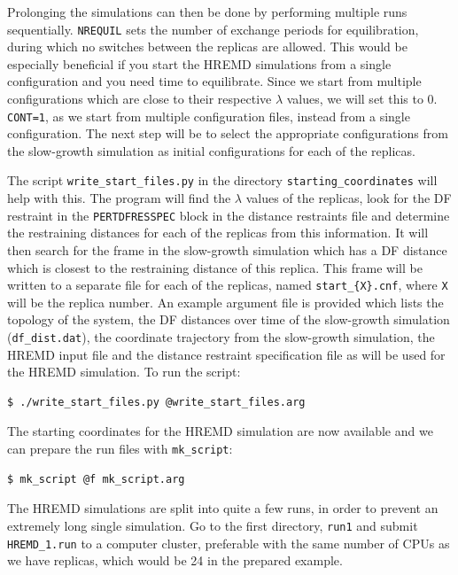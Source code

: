 Prolonging the simulations can then be done by performing multiple runs sequentially. 
\texttt{NREQUIL} sets the number of exchange periods for equilibration, during which no switches between the replicas are allowed. 
This would be especially beneficial if you start the HREMD simulations from a single configuration and you need time to equilibrate. 
Since we start from multiple configurations which are close to their respective $\lambda$ values, we will set this to 0. 
\texttt{CONT=1}, as we start from multiple configuration files, instead from a single configuration.
The next step will be to select the appropriate configurations from the slow-growth simulation as initial configurations for each of the replicas.

The script \texttt{write\_start\_files.py} in the directory \texttt{starting\_coordinates} will help with this. 
The program will find the $\lambda$ values of the replicas, look for the DF restraint in the \texttt{PERTDFRESSPEC} block in the distance restraints file and determine the restraining distances for each of the replicas from this information.
It will then search for the frame in the slow-growth simulation which has a DF distance which is closest to the restraining distance of this replica.
This frame will be written to a separate file for each of the replicas, named \texttt{start\_\{X\}.cnf}, where \texttt{X} will be the replica number. 
An example argument file is provided which lists the topology of the system, the DF distances over time of the slow-growth simulation (\texttt{df\_dist.dat}), the coordinate trajectory from the slow-growth simulation, the HREMD input file and the distance restraint specification file as will be used for the HREMD simulation. To run the script:
\begin{lstlisting}
$ ./write_start_files.py @write_start_files.arg 
\end{lstlisting}
The starting coordinates for the HREMD simulation are now available and we can prepare the run files with \texttt{mk\_script}:
\begin{lstlisting}
$ mk_script @f mk_script.arg
\end{lstlisting}
The HREMD simulations are split into quite a few runs, in order to prevent an extremely long single simulation. 
Go to the first directory, \texttt{run1} and submit \texttt{HREMD\_1.run} to a computer cluster, preferable with the same number of CPUs as we have replicas, which would be 24 in the prepared example. 

